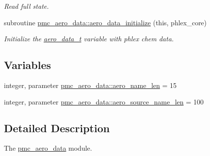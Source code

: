 \begin{DoxyCompactItemize}
\begin{DoxyCompactList}\small\item\em Read full state. \end{DoxyCompactList}\item 
subroutine \mbox{\hyperlink{namespacepmc__aero__data_a8496aa9cb03cd761a535fe6afb381059}{pmc\+\_\+aero\+\_\+data\+::aero\+\_\+data\+\_\+initialize}} (this, phlex\+\_\+core)
\begin{DoxyCompactList}\small\item\em Initialize the \mbox{\hyperlink{structpmc__aero__data_1_1aero__data__t}{aero\+\_\+data\+\_\+t}} variable with phlex chem data. \end{DoxyCompactList}\end{DoxyCompactItemize}
\subsection*{Variables}
\begin{DoxyCompactItemize}
\item 
integer, parameter \mbox{\hyperlink{namespacepmc__aero__data_a05ba86cdbb1bbbacbbc41cce6eba6474}{pmc\+\_\+aero\+\_\+data\+::aero\+\_\+name\+\_\+len}} = 15
\item 
integer, parameter \mbox{\hyperlink{namespacepmc__aero__data_adceb28b9bf685995bdcb53cacb52ee42}{pmc\+\_\+aero\+\_\+data\+::aero\+\_\+source\+\_\+name\+\_\+len}} = 100
\end{DoxyCompactItemize}


\subsection{Detailed Description}
The \mbox{\hyperlink{namespacepmc__aero__data}{pmc\+\_\+aero\+\_\+data}} module. 

